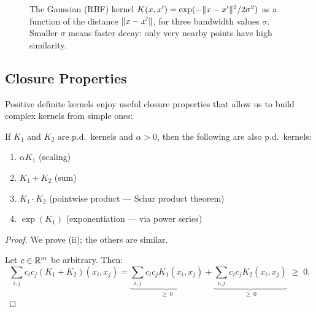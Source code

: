 \begin{notechapter}
\begin{figure}[ht]
\centering
{}
\caption{The Gaussian (RBF) kernel $K(x,x') =
\exp(-\| x-x' \|^2/2\sigma^2)$ as a function of the distance
$\| x-x' \|$, for three bandwidth values $\sigma$. Smaller $\sigma$
means faster decay: only very nearby points have high similarity.}
\label{rkhs:fig:rbf_kernel}
\end{figure}

\subsection{Closure Properties}
\label{rkhs:subsec:closure}

Positive definite kernels enjoy useful closure properties that allow us
to build complex kernels from simple ones:

\begin{proposition}
\label{rkhs:prop:closure}
If $K_1$ and $K_2$ are p.d.\ kernels and $\alpha > 0$, then the
following are also p.d.\ kernels:
\begin{enumerate}[label=(\roman*)]
  \item $\alpha K_1$ \quad (scaling)
  \item $K_1 + K_2$ \quad (sum)
  \item $K_1 \cdot K_2$ \quad (pointwise product --- Schur product theorem)
  \item $\exp(K_1)$ \quad (exponentiation --- via power series)
\end{enumerate}
\end{proposition}

\begin{proof}
We prove (ii); the others are similar.

Let $c \in \mathbb{R}^m$ be arbitrary. Then:
\[
\sum_{i,j} c_i c_j (K_1 + K_2)(x_i, x_j) = \underbrace{\sum_{i,j} c_i
c_j K_1(x_i, x_j)}_{\geq\, 0} + \underbrace{\sum_{i,j} c_i c_j K_2(x_i,
x_j)}_{\geq\, 0} \;\geq\; 0.
\]
\end{proof}


\end{notechapter}
